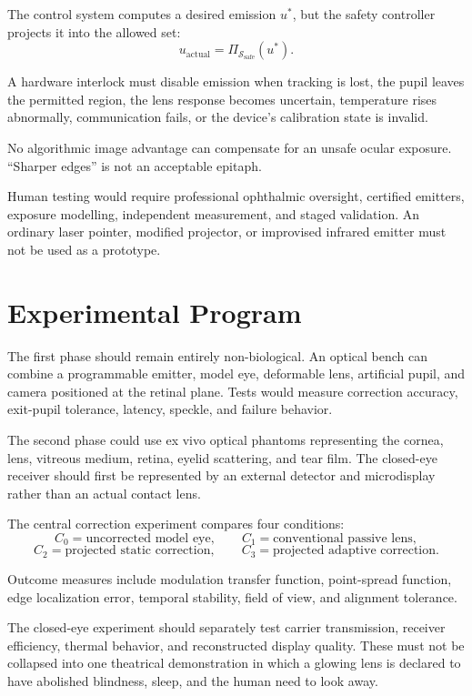 \documentclass[11pt]{article}
\begin{document}
The control system computes a desired emission $u^\ast$, but the safety controller projects it into the allowed set:
\[
u_{\mathrm{actual}}=\Pi_{\mathcal{S}_{\mathrm{safe}}}(u^\ast).
\]

A hardware interlock must disable emission when tracking is lost, the pupil leaves the permitted region, the lens response becomes uncertain, temperature rises abnormally, communication fails, or the device's calibration state is invalid.

No algorithmic image advantage can compensate for an unsafe ocular exposure. ``Sharper edges'' is not an acceptable epitaph.

Human testing would require professional ophthalmic oversight, certified emitters, exposure modelling, independent measurement, and staged validation. An ordinary laser pointer, modified projector, or improvised infrared emitter must not be used as a prototype.

\section{Experimental Program}

The first phase should remain entirely non-biological. An optical bench can combine a programmable emitter, model eye, deformable lens, artificial pupil, and camera positioned at the retinal plane. Tests would measure correction accuracy, exit-pupil tolerance, latency, speckle, and failure behavior.

The second phase could use ex vivo optical phantoms representing the cornea, lens, vitreous medium, retina, eyelid scattering, and tear film. The closed-eye receiver should first be represented by an external detector and microdisplay rather than an actual contact lens.

The central correction experiment compares four conditions:
\[
C_0=\text{uncorrected model eye}, \qquad C_1=\text{conventional passive lens},
\]
\[
C_2=\text{projected static correction}, \qquad C_3=\text{projected adaptive correction}.
\]

Outcome measures include modulation transfer function, point-spread function, edge localization error, temporal stability, field of view, and alignment tolerance.

The closed-eye experiment should separately test carrier transmission, receiver efficiency, thermal behavior, and reconstructed display quality. These must not be collapsed into one theatrical demonstration in which a glowing lens is declared to have abolished blindness, sleep, and the human need to look away.
\end{document}
